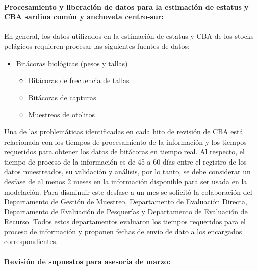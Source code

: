 \documentclass[
  spanish,
]{article}
\providecommand{\tightlist}{%
  \setlength{\itemsep}{0pt}\setlength{\parskip}{0pt}}
\begin{document}
\hypertarget{procesamiento-y-liberaciuxf3n-de-datos-para-la-estimaciuxf3n-de-estatus-y-cba-sardina-comuxfan-y-anchoveta-centro-sur}{%
\paragraph{Procesamiento y liberación de datos para la estimación de
estatus y CBA sardina común y anchoveta
centro-sur:}\label{procesamiento-y-liberaciuxf3n-de-datos-para-la-estimaciuxf3n-de-estatus-y-cba-sardina-comuxfan-y-anchoveta-centro-sur}}

En general, los datos utilizados en la estimación de estatus y CBA de
los stocks pelágicos requieren procesar las siguientes fuentes de datos:

\begin{itemize}
\item
  Bitácoras biológicas (pesos y tallas)

  \begin{itemize}
  \tightlist
  \item
    Bitácoras de frecuencia de tallas
  \item
    Bitácoras de capturas
  \item
    Muestreos de otolitos
  \end{itemize}
\end{itemize}

Una de las problemáticas identificadas en cada hito de revisión de CBA
está relacionada con los tiempos de procesamiento de la información y
los tiempos requeridos para obtener los datos de bitácoras en tiempo
real. Al respecto, el tiempo de proceso de la información es de 45 a 60
días entre el registro de los datos muestreados, su validación y
análisis, por lo tanto, se debe considerar un desfase de al menos 2
meses en la información disponible para ser usada en la modelación. Para
disminuir este desfase a un mes se solicitó la colaboración del
Departamento de Gestión de Muestreo, Departamento de Evaluación Directa,
Departamento de Evaluación de Pesquerías y Departamento de Evaluación de
Recurso. Todos estos departamentos evaluaron los tiempos requeridos para
el proceso de información y proponen fechas de envío de dato a los
encargados correspondientes. \vspace{0.5cm}

\hypertarget{revisiuxf3n-de-supuestos-para-asesoruxeda-de-marzo}{%
\paragraph{Revisión de supuestos para asesoría de
marzo:}\label{revisiuxf3n-de-supuestos-para-asesoruxeda-de-marzo}}
\end{document}
